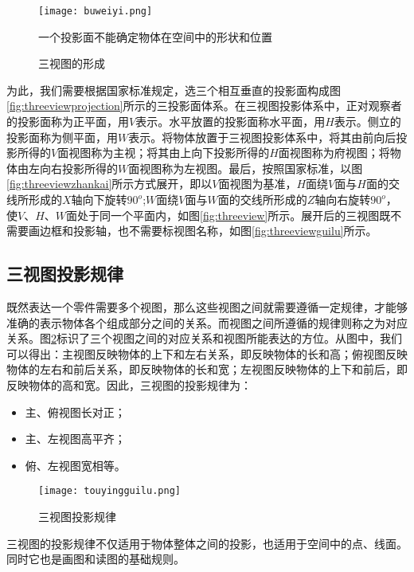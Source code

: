\begin{figure}[htbp]
\centering
\texttt{[image: buweiyi.png]}
\caption{一个投影面不能确定物体在空间中的形状和位置}\label{fig:singleprojection}
\end{figure}

\begin{figure}[htbp]
\centering
{}
\hspace{30pt}


\hspace{30pt}
\caption{三视图的形成}
\end{figure}

为此，我们需要根据国家标准规定，选三个相互垂直的投影面构成图\ref{fig:threeviewprojection}所示的三投影面体系。在三视图投影体系中，正对观察者的投影面称为正平面，用$V$表示。水平放置的投影面称水平面，用$H$表示。侧立的投影面称为侧平面，用$W$表示。将物体放置于三视图投影体系中，将其由前向后投影所得的$V$面视图称为主视；将其由上向下投影所得的$H$面视图称为府视图；将物体由左向右投影所得的$W$面视图称为左视图。最后，按照国家标准，以图\ref{fig:threeviewzhankai}所示方式展开，即以$V$面视图为基准，$H$面绕$V$面与$H$面的交线所形成的$X$轴向下旋转$90^o$;$W$面绕$V$面与$W$面的交线所形成的$Z$轴向右旋转$90^o$，使$V$、$H$、$W$面处于同一个平面内，如图\ref{fig:threeview}所示。展开后的三视图既不需要画边框和投影轴，也不需要标视图名称，如图\ref{fig:threeviewguilu}所示。

\subsection{三视图投影规律}
既然表达一个零件需要多个视图，那么这些视图之间就需要遵循一定规律，才能够准确的表示物体各个组成部分之间的关系。而视图之间所遵循的规律则称之为对应关系。图\ref{fig:threeviewguanxi}标识了三个视图之间的对应关系和视图所能表达的方位。从图中，我们可以得出：主视图反映物体的上下和左右关系，即反映物体的长和高；俯视图反映物体的左右和前后关系，即反映物体的长和宽；左视图反映物体的上下和前后，即反映物体的高和宽。因此，三视图的投影规律为：
\begin{itemize}
\item 主、俯视图长对正；
\item 主、左视图高平齐；
\item 俯、左视图宽相等。
\end{itemize}
\begin{figure}[htbp]
\texttt{[image: touyingguilu.png]}
\caption{三视图投影规律}\label{fig:threeviewguanxi}
\end{figure}
三视图的投影规律不仅适用于物体整体之间的投影，也适用于空间中的点、线面。同时它也是画图和读图的基础规则。

\endinput